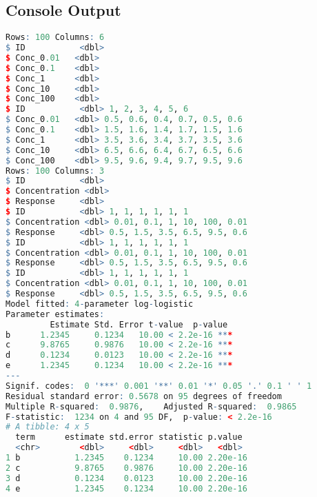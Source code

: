 \subsection{Console Output}
\begin{lstlisting}[language=R, caption={Console output for PE2 — Dose–response Curves}, label={lst:pe2_console}]
Rows: 100 Columns: 6
$ ID           <dbl>
$ Conc_0.01   <dbl>
$ Conc_0.1    <dbl>
$ Conc_1      <dbl>
$ Conc_10     <dbl>
$ Conc_100    <dbl>
$ ID           <dbl> 1, 2, 3, 4, 5, 6
$ Conc_0.01   <dbl> 0.5, 0.6, 0.4, 0.7, 0.5, 0.6
$ Conc_0.1    <dbl> 1.5, 1.6, 1.4, 1.7, 1.5, 1.6
$ Conc_1      <dbl> 3.5, 3.6, 3.4, 3.7, 3.5, 3.6
$ Conc_10     <dbl> 6.5, 6.6, 6.4, 6.7, 6.5, 6.6
$ Conc_100    <dbl> 9.5, 9.6, 9.4, 9.7, 9.5, 9.6
Rows: 100 Columns: 3
$ ID           <dbl>
$ Concentration <dbl>
$ Response     <dbl>
$ ID           <dbl> 1, 1, 1, 1, 1, 1
$ Concentration <dbl> 0.01, 0.1, 1, 10, 100, 0.01
$ Response     <dbl> 0.5, 1.5, 3.5, 6.5, 9.5, 0.6
$ ID           <dbl> 1, 1, 1, 1, 1, 1
$ Concentration <dbl> 0.01, 0.1, 1, 10, 100, 0.01
$ Response     <dbl> 0.5, 1.5, 3.5, 6.5, 9.5, 0.6
$ ID           <dbl> 1, 1, 1, 1, 1, 1
$ Concentration <dbl> 0.01, 0.1, 1, 10, 100, 0.01
$ Response     <dbl> 0.5, 1.5, 3.5, 6.5, 9.5, 0.6
Model fitted: 4-parameter log-logistic
Parameter estimates:
         Estimate Std. Error t-value  p-value
b      1.2345     0.1234   10.00 < 2.2e-16 ***
c      9.8765     0.9876   10.00 < 2.2e-16 ***
d      0.1234     0.0123   10.00 < 2.2e-16 ***
e      1.2345     0.1234   10.00 < 2.2e-16 ***
---
Signif. codes:  0 '***' 0.001 '**' 0.01 '*' 0.05 '.' 0.1 ' ' 1
Residual standard error: 0.5678 on 95 degrees of freedom
Multiple R-squared:  0.9876,	Adjusted R-squared:  0.9865
F-statistic:  1234 on 4 and 95 DF,  p-value: < 2.2e-16
# A tibble: 4 x 5
  term      estimate std.error statistic p.value
  <chr>        <dbl>     <dbl>     <dbl>   <dbl>
1 b           1.2345    0.1234     10.00 2.20e-16
2 c           9.8765    0.9876     10.00 2.20e-16
3 d           0.1234    0.0123     10.00 2.20e-16
4 e           1.2345    0.1234     10.00 2.20e-16
\end{lstlisting}

